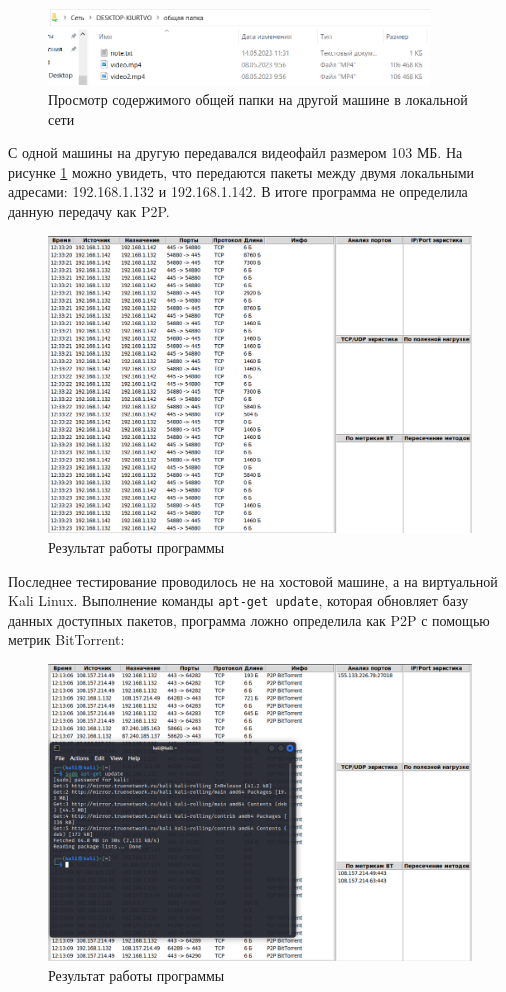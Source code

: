 \documentclass[bachelor, och, coursework]{SCWorks}
\begin{document}
\begin{figure}[H]
    \centering
    \includegraphics[width=0.9\textwidth]{papka3.png}
    \caption{Просмотр содержимого общей папки на другой машине в локальной сети}
\end{figure}

С одной машины на другую передавался видеофайл размером 103 МБ. На рисунке \ref{test7} можно увидеть, что передаются пакеты между двумя локальными адресами: 192.168.1.132 и 192.168.1.142. В итоге программа не определила данную передачу как P2P. 
\begin{figure}[H]
    \centering
    \includegraphics[width=1\textwidth]{test7.png}
    \caption{Результат работы программы}
    \label{test7}
\end{figure}

Последнее тестирование проводилось не на хостовой машине, а на виртуальной Kali Linux. Выполнение команды \texttt{apt-get update}, которая обновляет базу данных доступных пакетов, программа ложно определила как P2P с помощью метрик BitTorrent:
\begin{figure}[H]
    \centering
    \includegraphics[width=1\textwidth]{test6.png}
    \caption{Результат работы программы}
    \label{test6}
\end{figure}
\end{document}
